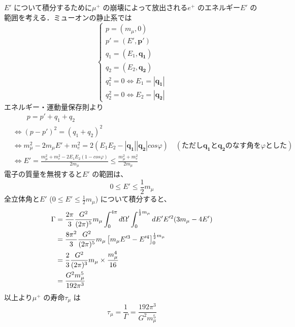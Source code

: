 %
$E'$ について積分するために$\mu^{+}$ の崩壊によって放出される$e^{+}$ のエネルギー$E'$ の範囲を考える．ミューオンの静止系では
%
\[\begin{cases}
  p=(m_{\mu},0)\\
  p'=(E',\bm{p'})\\
  q_{1}=(E_{1},\bm{q_{1}})\\
  q_{2}=(E_{2},\bm{q_{2}})\\
  q_{1}^{2}=0\Leftrightarrow E_{1}=|\bm{q_{1}}|\\
  q_{2}^{2}=0\Leftrightarrow E_{2}=|\bm{q_{2}}|
\end{cases}\]
%
エネルギー・運動量保存則より
%
\begin{align*}
  &\qquad p=p'+q_{1}+q_{2}\\
  &\Leftrightarrow (p-p')^{2}=(q_{1}+q_{2})^{2}\\
  &\Leftrightarrow m_{\mu}^{2}-2m_{\mu}E'+m_{e}^{2}=2(E_{1}E_{2}-|\bm{q_{1}}||\bm{q_{2}}|cos\varphi)\quad(ただし\bm{q_{1}} と\bm{q_{2}} のなす角を\varphi とした)\\
  &\Leftrightarrow E'=\frac{m_{\mu}^{2}+m_{e}^{2}-2E_{1}E_{2}(1-cos\varphi)}{2m_{\mu}}
  \le \frac{m_{\mu}^{2}+m_{e}^{2}}{2m_{\mu}}
\end{align*}
%
電子の質量を無視すると$E'$ の範囲は、
%
\[
0\le E'\le \frac{1}{2}m_{\mu}
\]
%
全立体角と$E'$ ($0\le E'\le\frac{1}{2}m_{\mu}$) について積分すると、
\begin{align}
  \Gamma&=\frac{2\pi}{3}\frac{G^{2}}{(2\pi)^{5}}m_{\mu}\int_{0}^{4\pi}d\Omega'\int_{0}^{\frac{1}{2}m_{\mu}}dE'E'^{2}(3m_{\mu}-4E')\notag\\
  &=\frac{8\pi^{2}}{3}\frac{G^{2}}{(2\pi)^{5}}m_{\mu}\left[m_{\mu}E'^{3}-E'^{4}\right]_{0}^{\frac{1}{2}m_{\mu}}\notag\\
  &=\frac{2}{3}\frac{G^{2}}{(2\pi)^{3}}m_{\mu}\times \frac{m_{\mu}^{4}}{16}\notag\\
  &=\frac{G^{2}m_{\mu}^{5}}{192\pi^{3}}
\end{align}
%
以上より$\mu^{+}$ の寿命$\tau_{\mu}$ は
\[\tau_{\mu}=\frac{1}{\Gamma}=\frac{192\pi^{3}}{G^{2}m_{\mu}^{5}}\]
%
%
%
